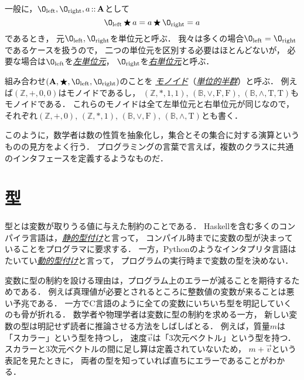 \documentclass[a5paper,draft]{jsbook}
\newcommand{\programminglanguage}[1]{\textsf{#1}}
\newcommand{\clang}{\programminglanguage{C}}
\newcommand{\haskell}{\programminglanguage{Haskell}}
\newcommand{\python}{\programminglanguage{Python}}
\newcommand{\keyword}[1]{{\underline{\emph{#1}}}}
\newcommand{\mathConstant}[1]{\mathrm{#1}} %
\newcommand{\mathSub}[1]{\textrm{#1}}
\newcommand{\mathSet}[1]{\mathbf{#1}} %
\newcommand{\mathSpecialSet}[1]{\mathbb{#1}} %
\newcommand{\mathTupleWith}[1]{\left(#1\right)}
\newcommand{\mathVectorVar}[1]{\vec{#1}}
\newcommand{\mathTrue}{\mathConstant{T}}
\newcommand{\mathFalse}{\mathConstant{F}}
\newcommand{\mathId}{\O}
\newcommand{\mathLeft}{\mathSub{left}}
\newcommand{\mathRight}{\mathSub{right}}
\newcommand{\mathBinaryOperator}[1]{\operatorname{#1}}
\newcommand{\mathAnyBinaryOperator}{\mathBinaryOperator{\bigstar}}
\newcommand{\mathIn}{\mathBinaryOperator{:\!:}}
\begin{document}
一般に，$\mathId_\mathLeft,\mathId_\mathRight,a\mathIn\mathSet{A}$として
\begin{equation}
\label{eq:identity}
\mathId_\mathLeft\mathAnyBinaryOperator a=a\mathAnyBinaryOperator\mathId_\mathRight=a
\end{equation}
であるとき，
元$\mathId_\mathLeft,\mathId_\mathRight$を単位元と呼ぶ．
我々は多くの場合$\mathId_\mathLeft=\mathId_\mathRight$であるケースを扱うので，
二つの単位元を区別する必要はほとんどないが，
必要な場合は$\mathId_\mathLeft$を\keyword{左単位元}，
$\mathId_\mathRight$を\keyword{右単位元}と呼ぶ．

組み合わせ$\mathTupleWith{\mathSet{A},\mathAnyBinaryOperator,\mathId_\mathLeft,\mathId_\mathRight}$のことを
\keyword{モノイド}（\keyword{単位的半群}）と呼ぶ．
例えば$\mathTupleWith{\mathSpecialSet{Z},+,0,0}$はモノイドであるし，
$\mathTupleWith{\mathSpecialSet{Z},*,1,1}$,
$\mathTupleWith{\mathSpecialSet{B},\vee,\mathFalse,\mathFalse}$,
$\mathTupleWith{\mathSpecialSet{B},\wedge,\mathTrue,\mathTrue}$もモノイドである．
これらのモノイドは全て左単位元と右単位元が同じなので，
それぞれ$\mathTupleWith{\mathSpecialSet{Z},+,0}$,
$\mathTupleWith{\mathSpecialSet{Z},*,1}$,
$\mathTupleWith{\mathSpecialSet{B},\vee,\mathFalse}$,
$\mathTupleWith{\mathSpecialSet{B},\wedge,\mathTrue}$とも書く．

このように，数学者は数の性質を抽象化し，集合とその集合に対する演算というものの見方をよく行う．
プログラミングの言葉で言えば，複数のクラスに共通のインタフェースを定義するようなものだ．

\section{型}

型とは変数が取りうる値に与えた制約のことである．
\haskell を含む多くのコンパイラ言語は，\keyword{静的型付け}と言って，
コンパイル時までに変数の型が決まっていることをプログラマに要求する．
一方，\python のようなインタプリタ言語はたいてい\keyword{動的型付け}と言って，
プログラムの実行時まで変数の型を決めない．

変数に型の制約を設ける理由は，プログラム上のエラーが減ることを期待するためである．
例えば真理値が必要とされるところに整数値の変数が来ることは悪い予兆である．
一方で\clang 言語のように全ての変数にいちいち型を明記していくのも骨が折れる．
数学者や物理学者は変数に型の制約を求める一方，
新しい変数の型は明記せず読者に推論させる方法をしばしばとる．
例えば，質量$m$は「スカラー」という型を持つし，
速度$\mathVectorVar{v}$は「3次元ベクトル」という型を持つ．
スカラーと3次元ベクトルの間に足し算は定義されていないため，
$m+\mathVectorVar{v}$という表記を見たときに，
両者の型を知っていれば直ちにエラーであることがわかる．
\end{document}
